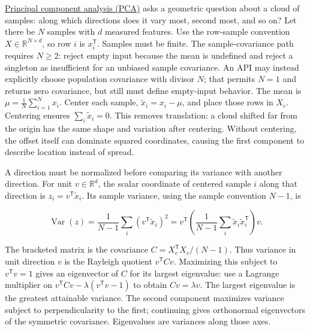 \hyperref[02-foundations-ii-ch024-centered-measurements-reveal-principal-directions]{Principal component analysis (PCA)} asks a geometric question about a cloud of samples: along which directions does it vary most, second most, and so on? Let there be \(N\) samples with \(d\) measured features. Use the row-sample convention \(X\in\mathbb R^{N\times d}\), so row \(i\) is \(x_i^\mathsf T\). Samples must be finite. The sample-covariance path requires \(N\ge2\): reject empty input because the mean is undefined and reject a singleton as insufficient for an unbiased sample covariance. An API may instead explicitly choose population covariance with divisor \(N\); that permits \(N=1\) and returns zero covariance, but still must define empty-input behavior. The mean is \(\mu=\frac1N\sum_{i=1}^N x_i\). Center each sample, \(\tilde x_i=x_i-\mu\), and place those rows in \(X_c\). Centering ensures \(\sum_i\tilde x_i=0\). This removes translation: a cloud shifted far from the origin has the same shape and variation after centering. Without centering, the offset itself can dominate squared coordinates, causing the first component to describe location instead of spread.

A direction must be normalized before comparing its variance with another direction. For unit \(v\in\mathbb R^d\), the scalar coordinate of centered sample \(i\) along that direction is \(z_i=v^\mathsf T\tilde x_i\). Its sample variance, using the sample convention \(N-1\), is

\[
\operatorname{Var}(z)=\frac1{N-1}\sum_i(v^\mathsf T\tilde x_i)^2
=v^\mathsf T\left(\frac1{N-1}\sum_i\tilde x_i\tilde x_i^\mathsf T\right)v.
\]

The bracketed matrix is the covariance \(C=X_c^\mathsf TX_c/(N-1)\). Thus variance in unit direction \(v\) is the Rayleigh quotient \(v^\mathsf TCv\). Maximizing this subject to \(v^\mathsf Tv=1\) gives an eigenvector of \(C\) for its largest eigenvalue: use a Lagrange multiplier on \(v^\mathsf TCv-\lambda(v^\mathsf Tv-1)\) to obtain \(Cv=\lambda v\). The largest eigenvalue is the greatest attainable variance. The second component maximizes variance subject to perpendicularity to the first; continuing gives orthonormal eigenvectors of the symmetric covariance. Eigenvalues are variances along those axes.

